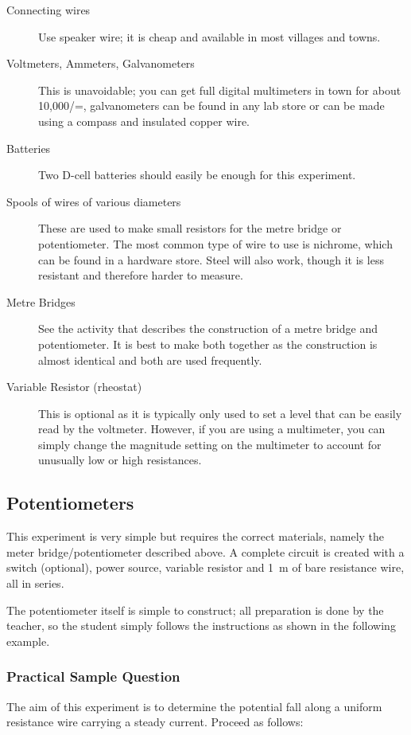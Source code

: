 \documentclass[12pt,a4paper]{report}
\begin{document}
\begin{description}
\item[Connecting wires]{Use speaker wire; it is cheap and available in most villages
and towns.}
\item[Voltmeters, Ammeters, Galvanometers]{This is unavoidable; you can get full
digital multimeters in town for about 10,000/=, galvanometers can be found in
any lab store or can be made using a compass and insulated copper wire.}
\item[Batteries]{Two D-cell batteries should easily be enough for this experiment.}
\item[Spools of wires of various diameters]{These are used to make small resistors for
the metre bridge or potentiometer. The most common type of wire to use is
nichrome, which can be found in a hardware store. Steel will also work, though it
is less resistant and therefore harder to measure.}
\item[Metre Bridges]{See the activity that describes the construction of a metre bridge
and potentiometer. It is best to make both together as the construction is almost
identical and both are used frequently.}
\item[Variable Resistor (rheostat)]{This is optional as it is typically only used to set a
level that can be easily read by the voltmeter. However, if you are using a
multimeter, you can simply change the magnitude setting on the multimeter to
account for unusually low or high resistances.}
\end{description}

\subsection{Potentiometers}

This experiment is very simple but requires the correct materials, namely the
meter bridge/potentiometer described above. A complete circuit is created with a switch
(optional), power source, variable resistor and 1~m of bare resistance wire, all in series.

The potentiometer itself is simple to construct; all preparation is done by the teacher, so
the student simply follows the instructions as shown in the following example.

\subsubsection{Practical Sample Question}

The aim of this experiment is to determine the potential fall along a uniform
resistance wire carrying a steady current. Proceed as follows:
\end{document}
